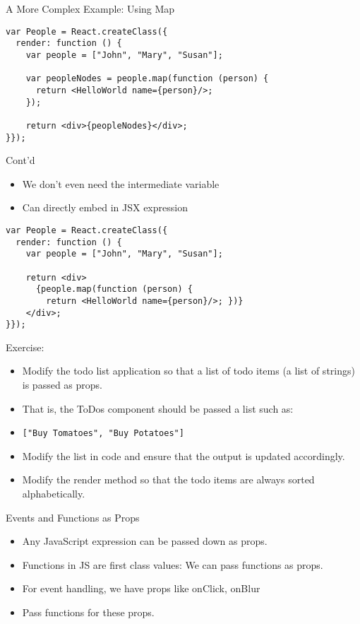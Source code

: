 \documentclass[presentation]{beamer}
\begin{document}
\begin{frame}[fragile,label={sec:orgheadline4}]{A More Complex Example: Using Map}
 \begin{verbatim}
var People = React.createClass({
  render: function () {
    var people = ["John", "Mary", "Susan"];

    var peopleNodes = people.map(function (person) {
      return <HelloWorld name={person}/>;
    });

    return <div>{peopleNodes}</div>;
}});
\end{verbatim}
\end{frame}

\begin{frame}[fragile,label={sec:orgheadline5}]{Cont'd}
 \begin{itemize}
\item We don't even need the intermediate variable
\item Can directly embed in JSX expression
\end{itemize}

\begin{verbatim}
var People = React.createClass({
  render: function () {
    var people = ["John", "Mary", "Susan"];

    return <div>
      {people.map(function (person) {
        return <HelloWorld name={person}/>; })}
    </div>;
}});
\end{verbatim}
\end{frame}

\begin{frame}[fragile,label={sec:orgheadline6}]{Exercise:}
 \begin{itemize}
\item Modify the todo list application so that a list of todo items (a list of
strings) is passed as props.
\item That is, the ToDos component should be passed a list such as:
\item \texttt{["Buy Tomatoes", "Buy Potatoes"]}
\item Modify the list in code and ensure that the output is updated accordingly.
\item Modify the render method so that the todo items are always sorted
alphabetically.
\end{itemize}
\end{frame}

\begin{frame}[label={sec:orgheadline7}]{Events and Functions as Props}
\begin{itemize}
\item Any JavaScript expression can be passed down as props.
\item Functions in JS are first class values: We can pass functions as props.
\item For event handling, we have props like onClick, onBlur
\item Pass functions for these props.
\end{itemize}
\end{frame}
\end{document}
